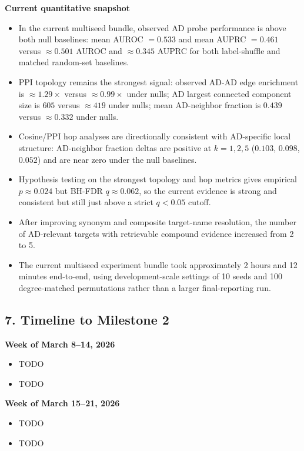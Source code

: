 \documentclass{article}
\begin{document}
\textbf{Current quantitative snapshot}
\begin{itemize}
    \item In the current multiseed bundle, observed AD probe performance is above both null baselines: mean AUROC $=0.533$ and mean AUPRC $=0.461$ versus $\approx 0.501$ AUROC and $\approx 0.345$ AUPRC for both label-shuffle and matched random-set baselines.
    \item PPI topology remains the strongest signal: observed AD-AD edge enrichment is $\approx 1.29\times$ versus $\approx 0.99\times$ under nulls; AD largest connected component size is $605$ versus $\approx 419$ under nulls; mean AD-neighbor fraction is $0.439$ versus $\approx 0.332$ under nulls.
    \item Cosine/PPI hop analyses are directionally consistent with AD-specific local structure: AD-neighbor fraction deltas are positive at $k=1,2,5$ ($0.103$, $0.098$, $0.052$) and are near zero under the null baselines.
    \item Hypothesis testing on the strongest topology and hop metrics gives empirical $p \approx 0.024$ but BH-FDR $q \approx 0.062$, so the current evidence is strong and consistent but still just above a strict $q<0.05$ cutoff.
    \item After improving synonym and composite target-name resolution, the number of AD-relevant targets with retrievable compound evidence increased from 2 to 5.
    \item The current multiseed experiment bundle took approximately 2 hours and 12 minutes end-to-end, using development-scale settings of 10 seeds and 100 degree-matched permutations rather than a larger final-reporting run.
\end{itemize}

\subsection*{7. Timeline to Milestone 2}
\textbf{Week of March 8--14, 2026}
\begin{itemize}
    \item TODO
    \item TODO
\end{itemize}

\textbf{Week of March 15--21, 2026}
\begin{itemize}
    \item TODO
    \item TODO
\end{itemize}
\end{document}
